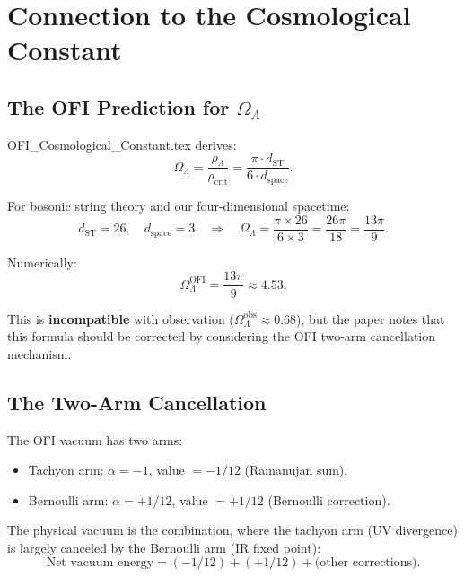 \documentclass[12pt]{article}
\theoremstyle{definition}
\newcommand{\rhoLambda}{\rho_\Lambda}
\begin{document}
\section{Connection to the Cosmological Constant}
\label{sec:cosmological}

\subsection{The OFI Prediction for $\Omega_\Lambda$}

OFI_Cosmological_Constant.tex derives:
\begin{equation}
  \Omega_\Lambda = \frac{\rhoLambda}{\rho_{\mathrm{crit}}} = \frac{\pi \cdot d_{\mathrm{ST}}}{6 \cdot d_{\mathrm{space}}}.
\end{equation}

For bosonic string theory and our four-dimensional spacetime:
\begin{equation}
  d_{\mathrm{ST}} = 26, \quad d_{\mathrm{space}} = 3 \quad \Rightarrow \quad
  \Omega_\Lambda = \frac{\pi \times 26}{6 \times 3} = \frac{26\pi}{18} = \frac{13\pi}{9}.
\end{equation}

Numerically:
\begin{equation}
  \Omega_\Lambda^{\mathrm{OFI}} = \frac{13\pi}{9} \approx 4.53.
\end{equation}

This is \textbf{incompatible} with observation ($\Omega_\Lambda^{\mathrm{obs}} \approx 0.68$),
but the paper notes that this formula should be corrected by considering the OFI two-arm
cancellation mechanism.

\subsection{The Two-Arm Cancellation}

The OFI vacuum has two arms:
\begin{itemize}
  \item Tachyon arm: $\alpha = -1$, value $= -1/12$ (Ramanujan sum).
  \item Bernoulli arm: $\alpha = +1/12$, value $= +1/12$ (Bernoulli correction).
\end{itemize}

The physical vacuum is the combination, where the tachyon arm (UV divergence) is
largely canceled by the Bernoulli arm (IR fixed point):
\begin{equation}
  \text{Net vacuum energy} = (-1/12) + (+1/12) + \text{(other corrections)}.
\end{equation}
\end{document}
